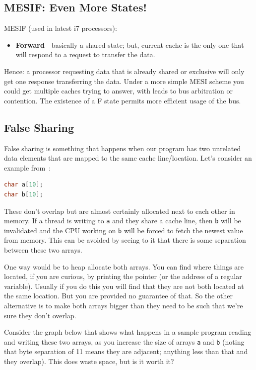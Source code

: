 \subsection*{MESIF: Even More States!}

    MESIF (used in latest i7 processors):
      \begin{itemize}
        \item {\bf Forward}---basically a shared state; but, current
          cache is the only one that will respond to a request to
          transfer the data.
      \end{itemize}

    Hence: a processor requesting data that is already shared or exclusive will
      only get one response transferring the data. Under a more simple MESI scheme you could get multiple caches trying to answer, with leads to bus arbitration or contention. The existence of a F state permits more efficient usage of the bus.
      
      
\subsection*{False Sharing}
False sharing is something that happens when our program has two unrelated data elements that are mapped to the same cache line/location. Let's consider an example from~\cite{falsesharing}:

\begin{lstlisting}[language=C]
char a[10];
char b[10];
\end{lstlisting}
These don't overlap but are almost certainly allocated next to each other in memory. If a thread is writing to \texttt{a} and they share a cache line, then \texttt{b} will be invalidated and the CPU working on \texttt{b} will be forced to fetch the newest value from memory. This can be avoided by seeing to it that there is some separation between these two arrays.

One way would be to heap allocate both arrays. You can find where things are located, if you are curious, by printing the pointer (or the address of a regular variable). Usually if you do this you will find that they are not both located at the same location. But you are provided no guarantee of that. So the other alternative is to make both arrays bigger than they need to be such that we're sure they don't overlap.

Consider the graph below that shows what happens in a sample program reading and writing these two arrays, as you increase the size of arrays \texttt{a} and \texttt{b} (noting that byte separation of 11 means they are adjacent; anything less than that and they overlap). This does waste space, but is it worth it?

